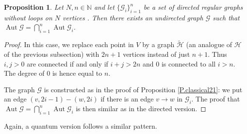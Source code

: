 \documentclass[12pt]{amsart}
\newtheorem{prop}[thm]{Proposition}
\theoremstyle{definition}
\theoremstyle{definition}
\theoremstyle{definition}
\theoremstyle{definition}
\DeclareMathOperator{\Aut}{Aut}
\newcommand{\N}{\mathbb{N}}
\newcommand{\Gr}{\mathcal{G}}
\newcommand{\Hr}{\mathcal{H}}
\numberwithin{equation}{section}
\begin{document}
\begin{prop}
\label{P.classical22}
 Let $ N, n \in \N$ and let $\{\Gr_i\}_{i=1}^n$ be a set of directed regular graphs without loops on $N$ vertices . Then there exists an undirected graph $\Gr$ such that $\Aut \Gr=\bigcap_{i=1}^n \Aut \Gr_i$.
\end{prop}
\begin{proof}
In this case, we replace each point in $V$ by a graph $\tilde{\Hr}$ (an analogue of $\Hr$ of the previous subsection) with $2n+1$ vertices instead of just $n+1$. Thus $i,j>0$ are connected if and only if $i+j>2n$ and $0$ is connected to all $i>n$. The degree of $0$ is hence equal to $n$.

The graph $\Gr$ is constructed as in the proof of Proposition \ref{P.classical21}: we put an edge $(v,2i-1)-(w,2i)$ if there is an edge $v\to w$ in $\Gr_i$. The proof that $\Aut \Gr=\bigcap_{i=1}^n \Aut \Gr_i$ is then similar as in the directed version.
\end{proof}

Again, a quantum version follows a similar pattern.
\end{document}
